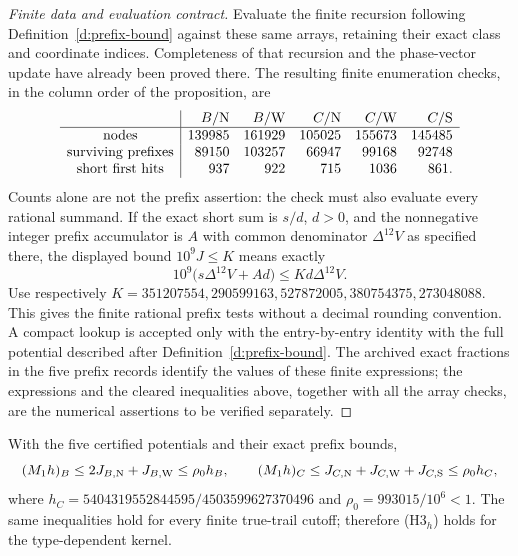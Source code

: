 \begin{proof}[Finite data and evaluation contract]
Evaluate the finite recursion following
Definition~\ref{d:prefix-bound} against these same arrays, retaining
their exact class and coordinate indices. Completeness of that
recursion and the phase-vector update have already been proved
there. The resulting finite enumeration checks, in the column
order of the proposition, are
\[
 \begin{array}{c|rrrrr}
 &B/{\rm N}&B/{\rm W}&C/{\rm N}&C/{\rm W}&C/{\rm S}\\ \hline
 \text{nodes}&139985&161929&105025&155673&145485\\
 \text{surviving prefixes}&89150&103257&66947&99168&92748\\
 \text{short first hits}&937&922&715&1036&861.
 \end{array}
\]
Counts alone are not the prefix assertion: the check must also
evaluate every rational summand. If the exact short sum is
\(s/d\), \(d>0\), and the nonnegative integer prefix accumulator
is \(A\) with common denominator \(\Delta^{12}V\) as specified
there, the displayed bound \(10^9J\le K\) means exactly
\[
 10^9\bigl(s\Delta^{12}V+Ad\bigr)
                  \le Kd\Delta^{12}V .
\]
Use respectively
\(K=351207554,290599163,527872005,380754375,273048088\).
This gives the finite rational prefix tests without a decimal
rounding convention. A compact lookup is accepted only with the
entry-by-entry identity with the full potential described after
Definition~\ref{d:prefix-bound}.
The archived exact fractions in the five prefix records identify
the values of these finite expressions; the expressions and the
cleared inequalities above, together with all the array checks,
are the numerical assertions to be verified separately.
\end{proof}

\begin{lemma}\label{l:stationary-assembly}
With the five certified potentials and their exact prefix bounds,
\[
 (M_1h)_B\le2J_{B,{\rm N}}+J_{B,{\rm W}}\le\rho_0h_B,\qquad
 (M_1h)_C\le J_{C,{\rm N}}+J_{C,{\rm W}}+J_{C,{\rm S}}
                                      \le\rho_0h_C ,
\]
where \(h_C=5404319552844595/4503599627370496\) and
\(\rho_0=993015/10^6<1\).
The same inequalities hold for every finite true-trail cutoff;
therefore (H3\(_h\)) holds for the type-dependent kernel.
\end{lemma}


